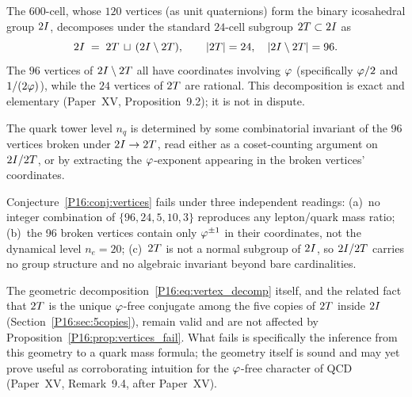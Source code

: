 The $600$-cell, whose $120$ vertices (as unit quaternions) form the
binary icosahedral group $2I$, decomposes under the standard
$24$-cell subgroup $2T\subset2I$ as
\begin{equation}
  2I \;=\; 2T \,\sqcup\, (2I\setminus2T),
  \qquad |2T|=24,\quad |2I\setminus2T|=96.
  \label{P16:eq:vertex_decomp}
\end{equation}
The $96$ vertices of $2I\setminus2T$ all have coordinates
involving $\varphi$ (specifically $\varphi/2$ and $1/(2\varphi)$), while the $24$
vertices of $2T$ are rational. This decomposition is exact and
elementary (Paper~XV, Proposition~9.2); it is not in dispute.

\begin{conjecture}
\label{P16:conj:vertices}
The quark tower level $n_q$ is determined by some combinatorial invariant
of the 96 vertices broken under $2I\to2T$, read either as a
coset-counting argument on $2I/2T$, or by extracting the
$\varphi$-exponent appearing in the broken vertices' coordinates.
\end{conjecture}

\begin{proposition}
\label{P16:prop:vertices_fail}
Conjecture~\ref{P16:conj:vertices} fails under three independent readings:
(a)~no integer combination of $\{96,24,5,10,3\}$ reproduces any
lepton/quark mass ratio; (b)~the 96 broken vertices contain only
$\varphi^{\pm1}$ in their coordinates, not the dynamical level $n_e=20$;
(c)~$2T$ is not a normal subgroup of $2I$, so $2I/2T$
carries no group structure and no algebraic invariant beyond bare
cardinalities.
\end{proposition}

\begin{remark}
\label{P16:rem:what_survives}
The geometric decomposition~\eqref{P16:eq:vertex_decomp} itself, and the
related fact that $2T$ is the unique $\varphi$-free conjugate among the
five copies of $2T$ inside $2I$ (Section~\ref{P16:sec:5copies}),
remain valid and are not affected by Proposition~\ref{P16:prop:vertices_fail}.
What fails is specifically the inference from this geometry to a
quark mass formula; the geometry itself is sound and may yet prove
useful as corroborating intuition for the $\varphi$-free character of QCD
(Paper~XV, Remark~9.4, after Paper~XV).
\end{remark}

